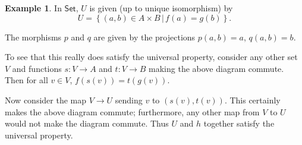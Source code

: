 \documentclass[a4paper,10pt]{scrreprt}
\theoremstyle{definition}
\newtheorem{example}{Example}[section]
\theoremstyle{plain}
\theoremstyle{remark}
\begin{document}
\begin{example}
  In $\mathsf{Set}$, $U$ is given (up to unique isomorphism) by 
  \begin{equation*}
    U = \left\{ (a,b) \in A \times B \,\big|\, f(a) = g(b) \right\}.
  \end{equation*}

  The morphisms $p$ and $q$ are given by the projections $p(a,b) = a$, $q(a,b) = b$.

  To see that this really does satisfy the universal property, consider any other set $V$ and functions $s\colon V \to A$ and $t\colon V \to B$ making the above diagram commute. Then for all $v \in V$, $f(s(v)) = t(g(v))$.

  Now consider the map $V \to U$ sending $v$ to $(s(v), t(v))$. This certainly makes the above diagram commute; furthermore, any other map from $V$ to $U$ would not make the diagram commute. Thus $U$ and $h$ together satisfy the universal property.
\end{example}
\end{document}
